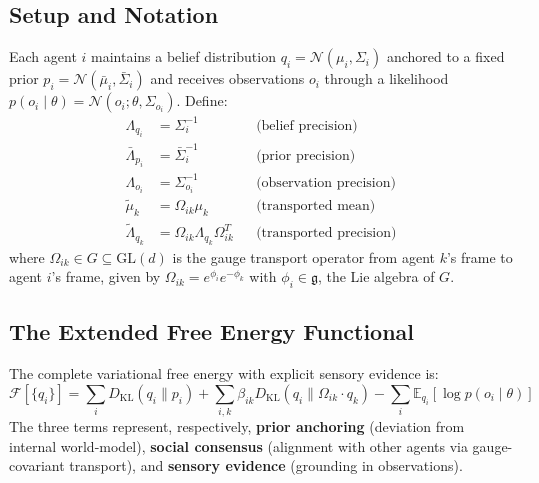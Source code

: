 \documentclass[12pt]{article}
\begin{document}
\subsection{Setup and Notation}

Each agent $i$ maintains a belief distribution $q_i = \mathcal{N}(\mu_i, \Sigma_i)$ anchored to a fixed prior $p_i = \mathcal{N}(\bar{\mu}_i, \bar{\Sigma}_i)$ and receives observations $o_i$ through a likelihood $p(o_i \mid \theta) = \mathcal{N}(o_i; \theta, \Sigma_{o_i})$. Define:
%
\begin{align}
\Lambda_{q_i} &= \Sigma_i^{-1} & &\text{(belief precision)} \\
\bar{\Lambda}_{p_i} &= \bar{\Sigma}_i^{-1} & &\text{(prior precision)} \\
\Lambda_{o_i} &= \Sigma_{o_i}^{-1} & &\text{(observation precision)} \\
\tilde{\mu}_k &= \Omega_{ik}\mu_k & &\text{(transported mean)} \\
\tilde{\Lambda}_{q_k} &= \Omega_{ik}\Lambda_{q_k}\Omega_{ik}^T & &\text{(transported precision)}
\end{align}
%
where $\Omega_{ik} \in G \subseteq \mathrm{GL}(d)$ is the gauge transport operator from agent $k$'s frame to agent $i$'s frame, given by $\Omega_{ik} = e^{\phi_i}e^{-\phi_k}$ with $\phi_i \in \mathfrak{g}$, the Lie algebra of $G$.

\subsection{The Extended Free Energy Functional}

The complete variational free energy with explicit sensory evidence is:
%
\begin{equation}
\boxed{
\mathcal{F}[\{q_i\}] = \sum_i D_{\mathrm{KL}}(q_i \| p_i) + \sum_{i,k} \beta_{ik} D_{\mathrm{KL}}(q_i \| \Omega_{ik}\cdot q_k) - \sum_i \mathbb{E}_{q_i}[\log p(o_i \mid \theta)]
}
\label{eq:full_free_energy}
\end{equation}
%
The three terms represent, respectively, \textbf{prior anchoring} (deviation from internal world-model), \textbf{social consensus} (alignment with other agents via gauge-covariant transport), and \textbf{sensory evidence} (grounding in observations).
\end{document}
